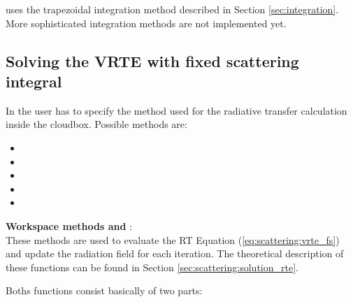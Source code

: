  uses the trapezoidal integration method
described in Section \ref{sec:integration}. More sophisticated
integration methods are not implemented yet.


\subsection{Solving the VRTE with fixed scattering integral}
\label{sec:scattering:RT_methods}

In  the user has to specify the method used for the radiative transfer calculation inside the cloudbox.
Possible methods are:
\begin{itemize}
\item {}
\item {}
\item {}
\item {}
\item {}
\end{itemize}

{\bf  Workspace methods  and }:\\

These methods are used to evaluate the RT Equation
(\ref{eq:scattering:vrte_fs}) and update the radiation field
 for each iteration. The theoretical description of
these functions can be found in Section
\ref{sec:scattering:solution_rte}.

Boths functions consist basically of two parts:

